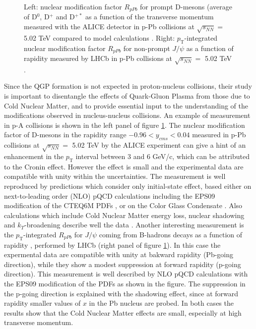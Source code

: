 \documentclass[b5paper,10pt,twoside,oldstyle,classica]{toptesi}
\newcommand{\pt}{p_\text{T}}
\begin{document}
\begin{figure}[tb]
\begin{center}
\caption{Left: nuclear modification factor $R_{pPb}$ for prompt D-mesons (average of D$^0$, D$^+$ and D$^{+*}$ as a function of the transverse momentum measured with the ALICE detector in p-Pb collisions at $\sqrt{s_{NN}} =$ 5.02 TeV compared to model calculations \cite{Abelev:2014hha}. Right: $\pt$-integrated nuclear modification factor $R_{pPb}$ for non-prompt $J/\psi$ as a function of rapidity measured by LHCb in p-Pb collisions at $\sqrt{s_{NN}} =$ 5.02 TeV \cite{Aaij:2013zxa}.}
\label{RpPb}
\end{center}
\end{figure}
Since the QGP formation is not expected in proton-nucleus collisions, their study is important to disentangle the effects of Quark-Gluon Plasma from those due to Cold Nuclear Matter, and to provide essential input to the understanding of the modifications observed in nucleus-nucleus collisions. An example of measurement in p-A collisions is shown in the left panel of figure \ref{RpPb}. The nuclear modification factor of D-mesons in the rapidity range $-0.96< y_{cms}<0.04$ measured in p-Pb collisions at $\sqrt{s_{NN}} =$ 5.02 TeV by the ALICE experiment \cite{Abelev:2014hha} can give a hint of an enhancement in the $\pt$ interval between 3 and 6 GeV/c, which can be attributed to the Cronin effect. However the effect is small and the experimental data are compatible with unity within the uncertainties.
The measurement is well reproduced by predictions which consider only initial-state effect, based either on next-to-leading order (NLO) pQCD calculations \cite{Mangano:1991jk} including the EPS09 modification of the CTEQ6M PDFs \cite{Eskola:2009uj}, or on the Color Glass Condensate \cite{Stump:2003yu}. Also calculations which include Cold Nuclear Matter energy loss, nuclear shadowing and $k_T$-broadening describe well the data \cite{Fujii:2013yja}. Another interesting measurement is the $\pt$-integrated $R_{pPb}$ for $J/\psi$ coming from B-hadrons decays as a function of rapidity \cite{Aaij:2013zxa}, performed by LHCb (right panel of figure \ref{RpPb}). In this case the expermental data are compatible with unity at bakward rapidity (Pb-going direction), while they show a modest suppression at forward rapidity (p-going direction). This measurement is well described by NLO pQCD calculations with the EPS09 modification of the PDFs as shown in the figure. The suppression in the p-going direction is explained with the shadowing effect, since at forward rapidity smaller values of $x$ in the Pb nucleus are probed.
In both cases the results show that the Cold Nuclear Matter effects are small, especially at high transverse momentum.  
\end{document}
